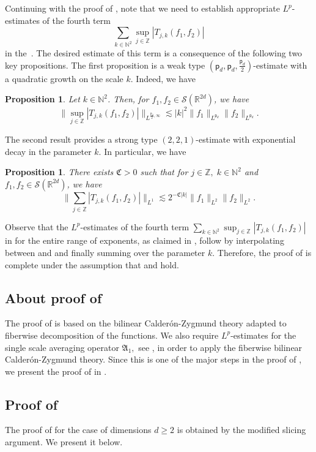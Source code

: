 \documentclass[a4paper,reqno]{amsart}
\newtheorem{proposition}[theorem]{Proposition}
\theoremstyle{definition}
\theoremstyle{remark}
\numberwithin{equation}{section}
\newcommand{\R}{{\mathbb {R}}}
\newcommand{\N}{{\mathbb N}}
\newcommand{\Z}{{\mathbb Z}}
\begin{document}
	Continuing with the proof of , note that we need to establish 
	appropriate $L^p$-estimates of the fourth term 
	$$\sum_{{k}\in\N^2}\sup_{j\in\Z}\left|T_{j,{k}}(f_1,f_2)\right|$$ 
	in the~. The desired estimate of this term is a consequence of the following two key propositions. 
	The first proposition is a weak type $\left({\mathsf{p}_d},{\mathsf{p}_d},\frac{\mathsf{p}_d}{2}\right)$-estimate 
	with a quadratic growth on the scale ${k}$. Indeed, we have
	\begin{proposition}\label{estimateGrowth}
		Let ${k}\in\N^2$. Then, for $f_1,f_2\in\mathcal{S}(\R^{2d})$, we have
		\[\Big\|\sup_{j\in\Z}|T_{j,{k}}(f_1,f_2)|\Big\|_{L^{\frac{\mathsf{p}_d}{2},\infty}}\lesssim |{k}|^{2}\|f_1\|_{L^{{\mathsf{p}_d}}}\|f_2\|_{L^{{\mathsf{p}_d}}}.\]
	\end{proposition}
	The second result provides a strong type $(2,2,1)$-estimate with 
	exponential decay in the parameter ${k}$. In particular, we have 
	\begin{proposition}\label{estimateDecay}
		There exists $\mathfrak{C}>0$ such that for $j\in\Z,\;{k}\in\N^2$ and $f_1,f_2\in\mathscr{S}(\R^{2d})$, we have
		\[\Big\|\sum_{j\in\Z}|T_{j,{k}}(f_1,f_2)|\Big\|_{L^1}\lesssim 2^{-\mathfrak{C}|{k}|}\|f_1\|_{L^2}\|f_2\|_{L^2}.\]
	\end{proposition} 
	Observe that the $L^p$-estimates of the fourth term 
	$\sum_{{k}\in\N^2}\sup_{j\in\Z}\left|T_{j,{k}}(f_1,f_2)\right|$ in  
	for the entire range of exponents, as claimed in , follow
	by interpolating between  and  and finally summing over the 
	parameter ${k}$. Therefore, the proof of  is complete under the assumption that 
	 and  hold. 
	\subsection*{About proof of } The proof of  is based on 
	the bilinear Calder\'{o}n-Zygmund theory adapted to fiberwise decomposition of the functions. We also require $L^p$-estimates 
	for the single scale averaging operator $\mathfrak{A}_1,$ see , in order to apply the fiberwise bilinear Calder\'{o}n-Zygmund theory. 
	Since this is one of the major steps in the proof of , we present the proof of  in . 
	\subsection*{Proof of }
	The proof of  for the case of dimensions $d\geq2$ is obtained by the modified slicing argument. We present it below.  
	
\end{document}
